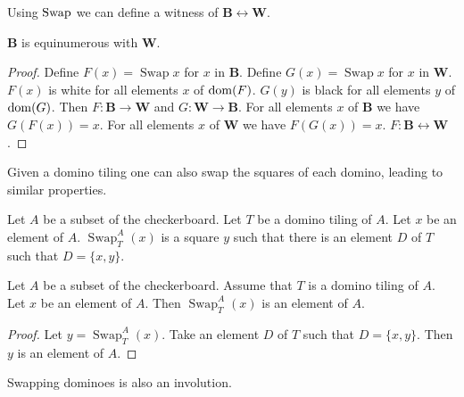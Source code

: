 \documentclass{article}
\newcommand{\Black}{\mathbf{B}}
\newcommand{\White}{\mathbf{W}}
\newcommand{\Swap}[1]{\operatorname{Swap}#1}
\newcommand{\Sw}[3]{\operatorname{Swap}_{#1}^{#2}(#3)}
\begin{document}
Using $\Swap$ we can define a witness of $\Black \leftrightarrow \White$.

\begin{forthel}
    \begin{lemma}
        $\Black$ is equinumerous with $\White$.
    \end{lemma}
    \begin{proof}
        Define $F(x) = \Swap{x}$ for $x$ in $\Black$.
        Define $G(x) = \Swap{x}$ for $x$ in $\White$.
        $F(x)$ is white for all elements $x$ of $\operatorname{dom}(F)$.
        $G(y)$ is black for all elements $y$ of $\operatorname{dom}(G)$.
        Then $F : \Black \to \White$ and $G : \White \to \Black$.
        For all elements $x$ of $\Black$ we have $G(F(x)) = x$.
        For all elements $x$ of $\White$ we have $F(G(x)) = x$.
        $F : \Black \leftrightarrow \White$.
    \end{proof}
\end{forthel}

Given a domino tiling one can also swap the squares of each domino,
leading to similar properties.

\begin{forthel}
    \begin{signature}
        Let $A$ be a subset of the checkerboard.
        Let $T$ be a domino tiling of $A$.
        Let $x$ be an element of $A$.
        $\Sw{T}{A}{x}$ is a square $y$ such that there is an element $D$ of $T$
        such that $D = \{x,y\}$.
    \end{signature}

    \begin{lemma}
        Let $A$ be a subset of the checkerboard.
        Assume that $T$ is a domino tiling of $A$.
        Let $x$ be an element of $A$.
        Then $\Sw{T}{A}{x}$ is an element of $A$.
    \end{lemma}
    \begin{proof}
        Let $y = \Sw{T}{A}{x}$.
        Take an element $D$ of $T$ such that $D = \{x,y\}$.
        Then $y$ is an element of $A$.
    \end{proof}
\end{forthel}


Swapping dominoes is also an involution.
\end{document}
